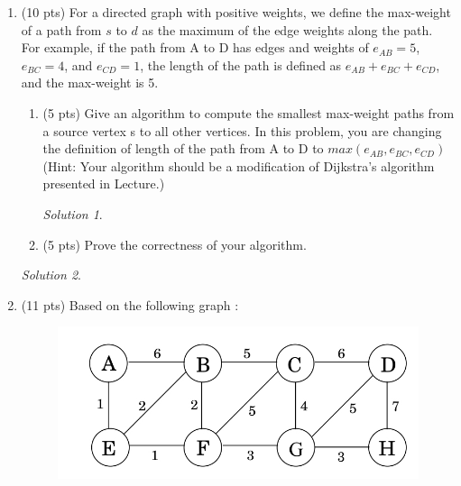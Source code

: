 \documentclass[12pt]{article}
\theoremstyle{remark}
\newtheorem*{solution}{Solution}
\begin{document}
\hrulefill

\newpage
\begin{enumerate}

\item (10 pts) For a directed graph with positive weights, we define the max-weight of a path from $s$ to $d$ as the maximum of the edge weights along the path. For example, if the path from A to D has edges and weights of $e_{AB} = 5$, $e_{BC} = 4$, and $e_{CD}=1$, the length of the path is defined as $e_{AB} + e_{BC} + e_{CD}$, and the max-weight is 5.
\begin{enumerate}
\item(5 pts) Give an algorithm to compute the smallest max-weight paths from a source vertex s to all other vertices. In this problem, you are changing the definition of length of the path from A to D to $max(e_{AB}, e_{BC}, e_{CD})$ (Hint: Your algorithm should be a modification of Dijkstra's algorithm presented in Lecture.)

\begin{solution}

\end{solution}

\pagebreak
\item(5 pts) Prove the correctness of your algorithm.
\end{enumerate}
\begin{solution}

\end{solution}

\pagebreak

\item (11 pts) Based on the following graph :
\begin{figure}[h!]
\begin{center}
\includegraphics[scale=0.3]{mst_graph_q2.jpg} 
\end{center}
\end{figure}

\begin{enumerate}[label=(\alph*)]


\end{enumerate}
\end{enumerate}
\end{document}
